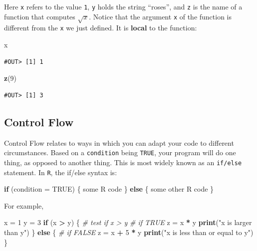 \documentclass[]{book}
\newenvironment{Shaded}{\begin{snugshade}}{\end{snugshade}}
\newcommand{\KeywordTok}[1]{\textcolor[rgb]{0.13,0.29,0.53}{\textbf{#1}}}
\newcommand{\DataTypeTok}[1]{\textcolor[rgb]{0.13,0.29,0.53}{#1}}
\newcommand{\DecValTok}[1]{\textcolor[rgb]{0.00,0.00,0.81}{#1}}
\newcommand{\StringTok}[1]{\textcolor[rgb]{0.31,0.60,0.02}{#1}}
\newcommand{\CommentTok}[1]{\textcolor[rgb]{0.56,0.35,0.01}{\textit{#1}}}
\newcommand{\OtherTok}[1]{\textcolor[rgb]{0.56,0.35,0.01}{#1}}
\newcommand{\ControlFlowTok}[1]{\textcolor[rgb]{0.13,0.29,0.53}{\textbf{#1}}}
\newcommand{\OperatorTok}[1]{\textcolor[rgb]{0.81,0.36,0.00}{\textbf{#1}}}
\newcommand{\NormalTok}[1]{#1}
\begin{document}
Here \texttt{x} refers to the value \texttt{1}, \texttt{y} holds the
string ``roses'', and \texttt{z} is the name of a function that computes
\(\sqrt{x}\). Notice that the argument \texttt{x} of the function is
different from the \texttt{x} we just defined. It is \textbf{local} to
the function:

\begin{Shaded}
\begin{Highlighting}[]
\NormalTok{x}
\end{Highlighting}
\end{Shaded}

\begin{verbatim}
#OUT> [1] 1
\end{verbatim}

\begin{Shaded}
\begin{Highlighting}[]
\KeywordTok{z}\NormalTok{(}\DecValTok{9}\NormalTok{)}
\end{Highlighting}
\end{Shaded}

\begin{verbatim}
#OUT> [1] 3
\end{verbatim}

\subsection{Control Flow}\label{control-flow}

Control Flow relates to ways in which you can adapt your code to
different circumstances. Based on a \texttt{condition} being
\texttt{TRUE}, your program will do one thing, as opposed to another
thing. This is most widely known as an \texttt{if/else} statement. In
\texttt{R}, the if/else syntax is:

\begin{Shaded}
\begin{Highlighting}[]
\ControlFlowTok{if}\NormalTok{ (}\DataTypeTok{condition =} \OtherTok{TRUE}\NormalTok{) \{}
\NormalTok{  some R code}
\NormalTok{\} }\ControlFlowTok{else}\NormalTok{ \{}
\NormalTok{  some other R code}
\NormalTok{\}}
\end{Highlighting}
\end{Shaded}

For example,

\begin{Shaded}
\begin{Highlighting}[]
\NormalTok{x =}\StringTok{ }\DecValTok{1}
\NormalTok{y =}\StringTok{ }\DecValTok{3}
\ControlFlowTok{if}\NormalTok{ (x }\OperatorTok{>}\StringTok{ }\NormalTok{y) \{  }\CommentTok{# test if x > y}
  \CommentTok{# if TRUE}
\NormalTok{  z =}\StringTok{ }\NormalTok{x }\OperatorTok{*}\StringTok{ }\NormalTok{y}
  \KeywordTok{print}\NormalTok{(}\StringTok{"x is larger than y"}\NormalTok{)}
\NormalTok{\} }\ControlFlowTok{else}\NormalTok{ \{}
  \CommentTok{# if FALSE}
\NormalTok{  z =}\StringTok{ }\NormalTok{x }\OperatorTok{+}\StringTok{ }\DecValTok{5} \OperatorTok{*}\StringTok{ }\NormalTok{y}
  \KeywordTok{print}\NormalTok{(}\StringTok{"x is less than or equal to y"}\NormalTok{)}
\NormalTok{\}}
\end{Highlighting}
\end{Shaded}
\end{document}
